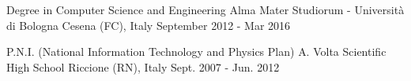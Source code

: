 

\begin{cventries}

  \cventry
    {Degree in Computer Science and Engineering} %
    {Alma Mater Studiorum - Università di Bologna} %
    {Cesena (FC), Italy} %
    {September 2012 - Mar 2016} %
    {}

  \cventry
    {P.N.I. (National Information Technology and Physics Plan)} %
    {A. Volta Scientific High School} %
    {Riccione (RN), Italy} %
    {Sept. 2007 - Jun. 2012} %
    {}

\end{cventries}
